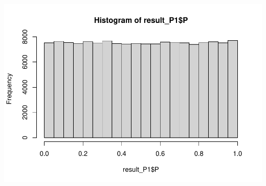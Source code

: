 \documentclass[
]{article}
\begin{document}
\includegraphics{stats-gene-research-progress-v6_files/figure-latex/unnamed-chunk-3-3.pdf}
\end{document}
